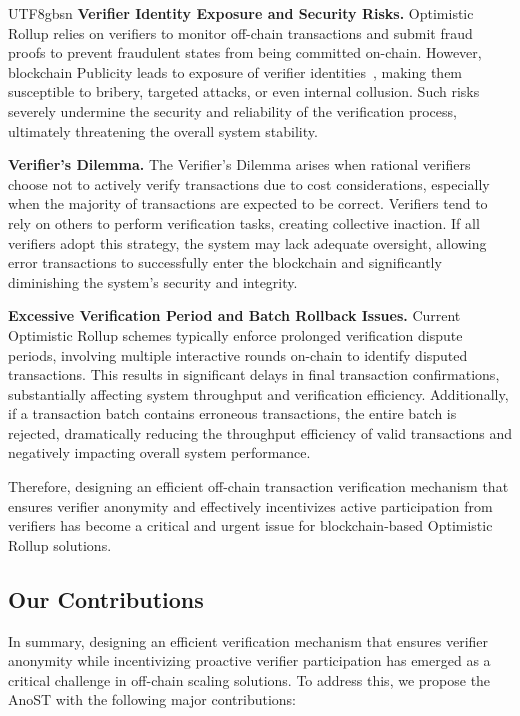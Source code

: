 \documentclass[runningheads]{llncs}
\begin{document}
\begin{CJK*}{UTF8}{gbsn}
\textbf{Verifier Identity Exposure and Security Risks.}  
Optimistic Rollup relies on verifiers to monitor off-chain transactions and submit fraud proofs to prevent fraudulent states from being committed on-chain. However, blockchain Publicity leads to exposure of verifier identities~\cite{id1,id2}, making them susceptible to bribery, targeted attacks, or even internal collusion. Such risks severely undermine the security and reliability of the verification process, ultimately threatening the overall system stability.

\textbf{Verifier's Dilemma.}  
The Verifier's Dilemma arises when rational verifiers choose not to actively verify transactions due to cost considerations, especially when the majority of transactions are expected to be correct. Verifiers tend to rely on others to perform verification tasks, creating collective inaction. If all verifiers adopt this strategy, the system may lack adequate oversight, allowing error transactions to successfully enter the blockchain and significantly diminishing the system's security and integrity.

\textbf{Excessive Verification Period and Batch Rollback Issues.}  
Current Optimistic Rollup schemes typically enforce prolonged verification dispute periods, involving multiple interactive rounds on-chain to identify disputed transactions. This results in significant delays in final transaction confirmations, substantially affecting system throughput and verification efficiency. Additionally, if a transaction batch contains erroneous transactions, the entire batch is rejected, dramatically reducing the throughput efficiency of valid transactions and negatively impacting overall system performance.

Therefore, designing an efficient off-chain transaction verification mechanism that ensures verifier anonymity and effectively incentivizes active participation from verifiers has become a critical and urgent issue for blockchain-based Optimistic Rollup solutions.

\subsection{Our Contributions}
In summary, designing an efficient verification mechanism that ensures verifier anonymity while incentivizing proactive verifier participation has emerged as a critical challenge in off-chain scaling solutions. To address this, we propose the AnoST with the following major contributions:


\end{CJK*}
\end{document}
